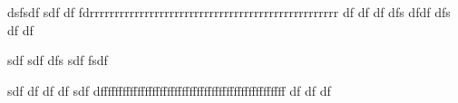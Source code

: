 dsfsdf
sdf
df
fdrrrrrrrrrrrrrrrrrrrrrrrrrrrrrrrrrrrrrrrrrrrrrrrrrr
df
df
df
dfs
dfdf
dfs
df
df

















sdf
sdf
dfs
sdf
fsdf

sdf
df
df
df
sdf
dffffffffffffffffffffffffffffffffffffffffffffffffff
df
df
df

